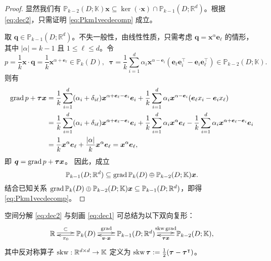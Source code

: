 \begin{proof}
显然我们有 $\mathbb P_{k-2}(D;\mathbb K)\boldsymbol x\subseteq\ker (\cdot \boldsymbol x)\cap \mathbb P_{k-1}(D;\mathbb R^d)$。根据 \eqref{eq:dec2}，只需证明 \eqref{eq:Pkm1vecdecomp} 成立。

取 $\boldsymbol q\in\mathbb P_{k-1}(D; \mathbb R^d)$。不失一般性，由线性性质，只需考虑 $\boldsymbol q=\boldsymbol x^{\alpha}\boldsymbol e_{\ell}$ 的情形，其中 $|\alpha|=k-1$ 且 $1\leq\ell\leq d$。令
$$
p=\frac{1}{k}\boldsymbol x\cdot\boldsymbol q=\frac{1}{k}\boldsymbol x^{\alpha+\boldsymbol e_{\ell}}\in\mathbb P_{k}(D), \;\; \boldsymbol\tau=\frac{1}{k}\sum_{i=1}^d\alpha_i\boldsymbol x^{\alpha-\boldsymbol e_{i}}(\boldsymbol e_{\ell}\boldsymbol e_{i}^{\intercal}-\boldsymbol e_{i}\boldsymbol e_{\ell}^{\intercal})\in\mathbb P_{k-2}(D;\mathbb K).
$$
则有
\begin{align*}
\operatorname{grad} p+\boldsymbol\tau\boldsymbol x& = \frac{1}{k}\sum_{i=1}^d(\alpha_i+\delta_{i\ell})\boldsymbol x^{\alpha+\boldsymbol e_{\ell}-\boldsymbol e_{i}}\boldsymbol e_{i} + \frac{1}{k}\sum_{i=1}^d\alpha_i\boldsymbol x^{\alpha-\boldsymbol e_{i}}(\boldsymbol e_{\ell}x_{i}-\boldsymbol e_{i}x_{\ell}) \\
& = \frac{1}{k}\sum_{i=1}^d(\alpha_i+\delta_{i\ell})\boldsymbol x^{\alpha+\boldsymbol e_{\ell}-\boldsymbol e_{i}}\boldsymbol e_{i} + \frac{1}{k}\sum_{i=1}^d\alpha_i\boldsymbol x^{\alpha}\boldsymbol e_{\ell} - \frac{1}{k}\sum_{i=1}^d\alpha_i\boldsymbol x^{\alpha+\boldsymbol e_{\ell}-\boldsymbol e_{i}}\boldsymbol e_{i} \\
&=\frac{1}{k}\boldsymbol x^{\alpha}\boldsymbol e_{\ell}+\frac{|\alpha|}{k}\boldsymbol x^{\alpha}\boldsymbol e_{\ell}=\boldsymbol x^{\alpha}\boldsymbol e_{\ell},
\end{align*}
即 $\boldsymbol q=\operatorname{grad} p+\boldsymbol\tau\boldsymbol x$。 因此，成立
$$
\mathbb P_{k-1}(D; \mathbb R^d)\subseteq \operatorname{grad} \mathbb P_{k}(D)\oplus\mathbb P_{k-2}(D;\mathbb K)\boldsymbol x.
$$ 
结合已知关系 $\operatorname{grad} \mathbb P_{k}(D)\oplus\mathbb P_{k-2}(D;\mathbb K)\boldsymbol x\subseteq\mathbb P_{k-1}(D; \mathbb R^d)$，即得 \eqref{eq:Pkm1vecdecomp}。
\end{proof}

空间分解 \eqref{eq:dec2} 与刻画 \eqref{eq:dec1} 可总结为以下双向复形：
\begin{equation*}%
\xymatrix{
\mathbb R\ar@<0.4ex>[r]^-{\subset} & \mathbb P_{k}(D)\ar@<0.4ex>[r]^-{\grad} \ar@<0.4ex>[l]^-{\pi_0}  & \mathbb P_{k-1}(D;\mathbb R^d)\ar@<0.4ex>[r]^-{\skw\grad}\ar@<0.4ex>[l]^-{\boldsymbol v\cdot\boldsymbol x}  & \mathbb P_{k-2}(D;\mathbb K) \ar@<0.4ex>[l]^-{\boldsymbol\tau\boldsymbol x},
}
\end{equation*}
其中反对称算子 $\operatorname{skw}:\mathbb R^{d\times d}\to\mathbb K$ 定义为 $\operatorname{skw}\boldsymbol{\tau}:=\frac{1}{2}(\boldsymbol{\tau}-\boldsymbol{\tau}^{\intercal})$。


